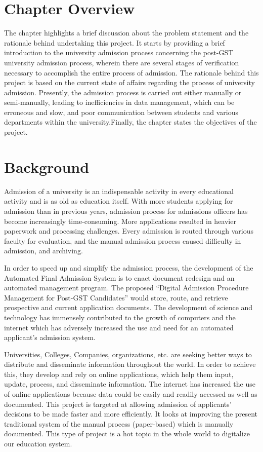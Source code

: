 

\section{Chapter Overview}
The chapter highlights a brief discussion about the problem statement and the rationale behind undertaking this project. It starts by providing a brief introduction to the university admission process concerning the post-GST university admission process, wherein there are several stages of verification necessary to accomplish the entire process of admission. The rationale behind this project is based on the current state of affairs regarding the process of university admission. Presently, the admission process is carried out either manually or semi-manually, leading to inefficiencies in data management, which can be erroneous and slow, and poor communication between students and various departments within the university.Finally, the chapter states the objectives of the project.

\section{Background}

\noindent Admission of a university is an indispensable activity in every educational activity and is as old as education itself. With more students applying for admission than in previous years, admission process for admissions officers has become increasingly time-consuming. More applications resulted in heavier paperwork and processing challenges. Every admission is routed through various faculty for evaluation, and the manual admission process caused difficulty in admission, and archiving. 

\vspace{0.3cm}

\noindent In order to speed up and simplify the admission process, the development of the Automated Final Admission System is to enact document redesign and an automated management program. The proposed ``Digital Admission Procedure Management for Post-GST Candidates'' would store, route, and retrieve prospective and current application documents. The development of science and technology has immensely contributed to the growth of computers and the internet which has adversely increased the use and need for an automated applicant's admission system. 

\vspace{0.3cm}

\noindent Universities, Colleges, Companies, organizations, etc. are seeking better ways to distribute and disseminate information throughout the world. In order to achieve this, they develop and rely on online applications, which help them input, update, process, and disseminate information. The internet has increased the use of online applications because data could be easily and readily accessed as well as documented. This project is targeted at allowing admission of applicants' decisions to be made faster and more efficiently. It looks at improving the present traditional system of the manual process (paper-based) which is manually documented. This type of project is a hot topic in the whole world to digitalize our education system.